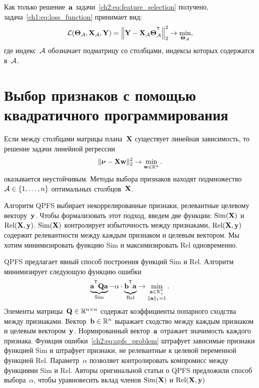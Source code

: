 Как только решение~$\mathbf{a}$ задачи~\eqref{ch2:eq:feature_selection} получено, задача~\eqref{ch1:eq:loss_function} принимает вид:
\begin{equation*}
\mathcal{L}(\bTheta_{\cA}, \bX_{\cA}, \bY) = {\left\| \mathbf{Y} - \bX_{\cA}\bTheta^{\T}_{\cA} \right\| }_2^2 \rightarrow\min_{\bTheta_{\cA}},
\end{equation*}
где индекс~$\mathcal{A}$ обозначает подматрицу со столбцами, индексы которых содержатся в~$\mathcal{A}$.

\section{Выбор признаков с помощью квадратичного программирования}

Если между столбцами матрицы плана~$\mathbf{X}$ существует линейная зависимость, то решение задачи линейной регрессии
\begin{equation}
\| \boldsymbol{\nu} - \mathbf{X} \mathbf{w}\|_2^2 \rightarrow\min_{\mathbf{w} \in \mathbb{R}^{n}}.
\label{ch2:eq:linear_regression}
\end{equation}
оказывается неустойчивым. 
Методы выбора признаков находят подмножество~$ \mathcal{A} \in \{1, \dots, n\}$ оптимальных столбцов~$\mathbf{X}$. 

Алгоритм QPFS выбирает некоррелированные признаки, релевантные целевому вектору~$\mathbf{y}$.
Чтобы формализовать этот подход, введем две функции: $\text{Sim}(\mathbf{X})$ и $\text{Rel}(\mathbf{X}, \mathbf{y})$. 
$\text{Sim}(\mathbf{X})$ контролирует избыточность между признаками, $\text{Rel}(\mathbf{X}, \mathbf{y})$ содержит релевантности между каждым признаком и целевым вектором. 
Мы хотим минимизировать функцию Sim и максимизировать Rel одновременно.

QPFS предлагает явный способ построения функций Sim и Rel. 
Алгоритм минимизирует следующую функцию ошибки
\begin{equation}
\underbrace{\ba^{\T} \bQ \ba}_{\text{Sim}} - \alpha \cdot \underbrace{\vphantom{()} \mathbf{b}^{\T} \ba}_{\text{Rel}} \rightarrow \min_{\substack{\ba \in \bbR^n_+ \\ \|\ba\|_1=1}}.
\label{ch2:eq:qpfs_problem}
\end{equation}
Элементы матрицы~$\mathbf{Q} \in \mathbb{R}^{n \times n}$ содержат коэффициенты попарного сходства между признаками. 
Вектор~$\mathbf{b} \in \mathbb{R}^n$ выражает сходство между каждым признаком и целевым вектором~$\mathbf{y}$.
Нормированный вектор~$\mathbf{a}$ отражает значимость каждого признака. 
Функция ошибки~\eqref{ch2:eq:qpfs_problem} штрафует зависимые признаки функцией Sim и штрафует признаки, не релевантные к целевой переменной функцией Rel. 
Параметр~$\alpha$ позволяет контролировать компромисс между функциями Sim и Rel.
Авторы оригинальной статьи о QPFS предложили способ выбора~$\alpha$, чтобы уравновесить вклад членов $\text{Sim}(\mathbf{X})$ и $\text{Rel}(\mathbf{X}, \mathbf{y})$

